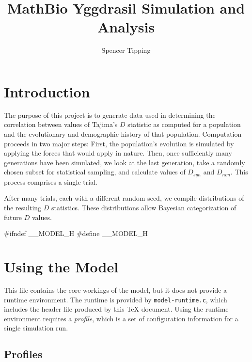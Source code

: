 \documentclass{article}
\begin{document}
  \title{MathBio Yggdrasil Simulation and Analysis}
  \author{Spencer Tipping}
  \maketitle

  \tableofcontents

  \def\D{$D$}
  \def\Ds{$D_{syn}$}
  \def\Dn{$D_{non}$}

  \section{Introduction}
    \label{sec:introduction}

    The purpose of this project is to generate data used in determining the
    correlation between values of Tajima's \D{} statistic as computed for a
    population and the evolutionary and demographic history of that population.
    Computation proceeds in two major steps: First, the population's evolution
    is simulated by applying the forces that would apply in nature. Then, once
    sufficiently many generations have been simulated, we look at the last
    generation, take a randomly chosen subset for statistical sampling, and
    calculate values of \Ds{} and \Dn. This process comprises a single trial.

    After many trials, each with a different random seed, we compile
    distributions of the resulting \D{} statistics. These distributions allow
    Bayesian categorization of future \D{} values.

\begin{ccode}
#ifndef __MODEL_H
#define __MODEL_H
\end{ccode}

  \section{Using the Model}
    \label{sec:using}

    This file contains the core workings of the model, but it does not provide a
    runtime environment. The runtime is provided by \verb|model-runtime.c|,
    which includes the header file produced by this \TeX{} document. Using the
    runtime environment requires a {\em profile}, which is a set of
    configuration information for a single simulation run.

    \subsection{Profiles}
      \label{sec:profiles}
\end{document}
